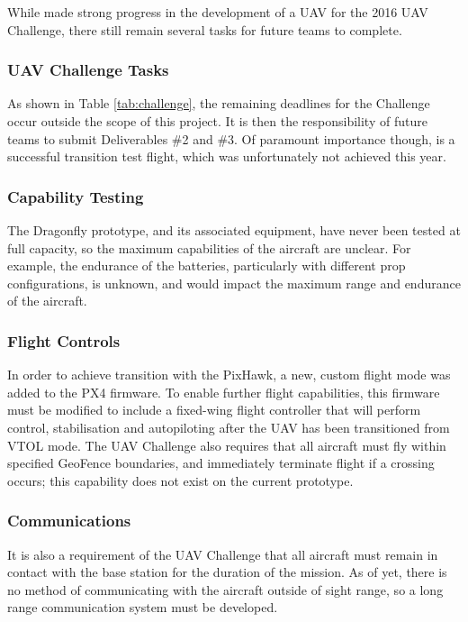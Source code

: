 \label{sec:futurework}
While \ID made strong progress in the development of a UAV for the 2016 UAV Challenge, there still remain several tasks for future teams to complete.

\subsubsection*{UAV Challenge Tasks}
As shown in Table \ref{tab:challenge}, the remaining deadlines for the Challenge occur outside the scope of this project. It is then the responsibility of future teams to submit Deliverables \#2 and \#3.  Of paramount importance though, is a successful transition test flight, which was unfortunately not achieved this year.

\subsubsection*{Capability Testing}
The Dragonfly prototype, and its associated equipment, have never been tested at full capacity, so the maximum capabilities of the aircraft are unclear. For example, the endurance of the batteries, particularly with different prop configurations, is unknown, and would impact the maximum range and endurance of the aircraft.

\subsubsection*{Flight Controls}
In order to achieve transition with the PixHawk, a new, custom flight mode was added to the PX4 firmware. To enable further flight capabilities, this firmware must be modified to include a fixed-wing flight controller that will perform control, stabilisation and autopiloting after the UAV has been transitioned from VTOL mode. The UAV Challenge also requires that all aircraft must fly within specified GeoFence boundaries, and immediately terminate flight if a crossing occurs; this capability does not exist on the current prototype.

\subsubsection*{Communications}
It is also a requirement of the UAV Challenge that all aircraft must remain in contact with the base station for the duration of the mission. As of yet, there is no method of communicating with the aircraft outside of sight range, so a long range communication system must be developed. 

